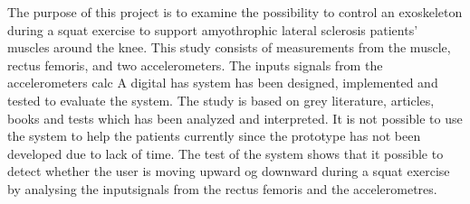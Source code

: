 The purpose of this project is to examine the possibility to control an exoskeleton during a squat exercise to support amyothrophic lateral sclerosis patients' muscles around the knee. This study consists of measurements from the muscle, rectus femoris, and two accelerometers. The inputs signals from the accelerometers calc
 A digital has system has been designed, implemented and tested to evaluate the system. The study is based on grey literature, articles, books and tests which has been analyzed and interpreted. It is not possible to use the system to help the patients currently since the prototype has not been developed due to lack of time. The test of the system shows that it possible to detect whether the user is moving upward og downward during a squat exercise by analysing the inputsignals from the rectus femoris and the accelerometres. 